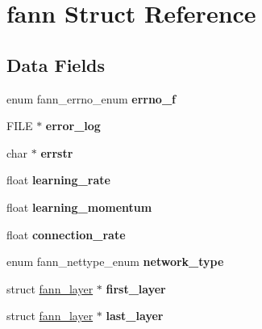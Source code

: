 \hypertarget{structfann}{\section{fann Struct Reference}
\label{structfann}
}
\subsection*{Data Fields}
\begin{DoxyCompactItemize}
\item 
\hypertarget{structfann_a5b46be6dfa18da5620d4ce1b8654f0af}{enum fann\-\_\-errno\-\_\-enum {\bfseries errno\-\_\-f}}\label{structfann_a5b46be6dfa18da5620d4ce1b8654f0af}

\item 
\hypertarget{structfann_a0942b9a4f7a184e9d6b95901e2b9ba4f}{F\-I\-L\-E $\ast$ {\bfseries error\-\_\-log}}\label{structfann_a0942b9a4f7a184e9d6b95901e2b9ba4f}

\item 
\hypertarget{structfann_ac3a29d5a3e50771c8ce7cf18bc093a6e}{char $\ast$ {\bfseries errstr}}\label{structfann_ac3a29d5a3e50771c8ce7cf18bc093a6e}

\item 
\hypertarget{structfann_ad05dcf6fc713294a727588d246d0c924}{float {\bfseries learning\-\_\-rate}}\label{structfann_ad05dcf6fc713294a727588d246d0c924}

\item 
\hypertarget{structfann_ae2925d7ed2b414184505b6cf429ff4c2}{float {\bfseries learning\-\_\-momentum}}\label{structfann_ae2925d7ed2b414184505b6cf429ff4c2}

\item 
\hypertarget{structfann_a36aff276164b3dae682af5e165d8a6d6}{float {\bfseries connection\-\_\-rate}}\label{structfann_a36aff276164b3dae682af5e165d8a6d6}

\item 
\hypertarget{structfann_a9c5bdd2b149f9da37ba289450992ad1e}{enum fann\-\_\-nettype\-\_\-enum {\bfseries network\-\_\-type}}\label{structfann_a9c5bdd2b149f9da37ba289450992ad1e}

\item 
\hypertarget{structfann_ab7f778bd6a8eed156b75c92f1a4a3f3e}{struct \hyperlink{structfann__layer}{fann\-\_\-layer} $\ast$ {\bfseries first\-\_\-layer}}\label{structfann_ab7f778bd6a8eed156b75c92f1a4a3f3e}

\item 
\hypertarget{structfann_a2f3bfb19e3f62ef32e6f1b11ce14aa67}{struct \hyperlink{structfann__layer}{fann\-\_\-layer} $\ast$ {\bfseries last\-\_\-layer}}\label{structfann_a2f3bfb19e3f62ef32e6f1b11ce14aa67}


\end{DoxyCompactItemize}
